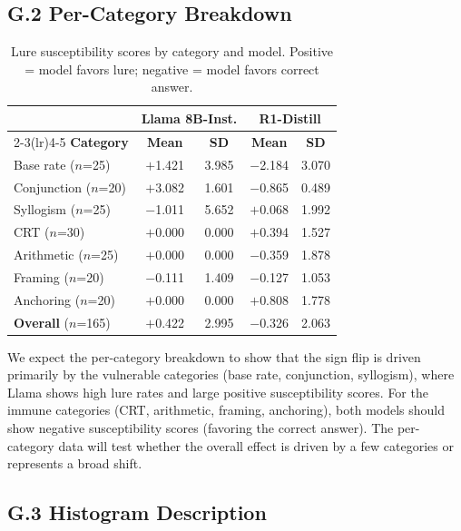\documentclass[accepted]{article}
\begin{document}
\subsection*{G.2 Per-Category Breakdown}

\begin{table}[ht]
\centering
\caption{Lure susceptibility scores by category and model.
  Positive = model favors lure; negative = model favors correct
  answer.}
\label{tab:lure_by_category}
\vspace{4pt}
\small
\begin{tabular}{lcccc}
\toprule
& \multicolumn{2}{c}{\textbf{Llama 8B-Inst.}} & \multicolumn{2}{c}{\textbf{R1-Distill}} \\
\cmidrule(lr){2-3}\cmidrule(lr){4-5}
\textbf{Category} & \textbf{Mean} & \textbf{SD} & \textbf{Mean} & \textbf{SD} \\
\midrule
Base rate ($n$=25)    & $+$1.421 & 3.985 & $-$2.184 & 3.070 \\
Conjunction ($n$=20)  & $+$3.082 & 1.601 & $-$0.865 & 0.489 \\
Syllogism ($n$=25)    & $-$1.011 & 5.652 & $+$0.068 & 1.992 \\
CRT ($n$=30)          & $+$0.000 & 0.000 & $+$0.394 & 1.527 \\
Arithmetic ($n$=25)   & $+$0.000 & 0.000 & $-$0.359 & 1.878 \\
Framing ($n$=20)      & $-$0.111 & 1.409 & $-$0.127 & 1.053 \\
Anchoring ($n$=20)    & $+$0.000 & 0.000 & $+$0.808 & 1.778 \\
\midrule
\textbf{Overall} ($n$=165) & $+$0.422 & 2.995 & $-$0.326 & 2.063 \\
\bottomrule
\end{tabular}
\end{table}

\noindent We expect the per-category breakdown to show that the
sign flip is driven primarily by the vulnerable categories (base
rate, conjunction, syllogism), where Llama shows high lure rates
and large positive susceptibility scores.  For the immune categories
(CRT, arithmetic, framing, anchoring), both models should show
negative susceptibility scores (favoring the correct answer).  The
per-category data will test whether the overall effect is driven by
a few categories or represents a broad shift.

\subsection*{G.3 Histogram Description}
\end{document}
